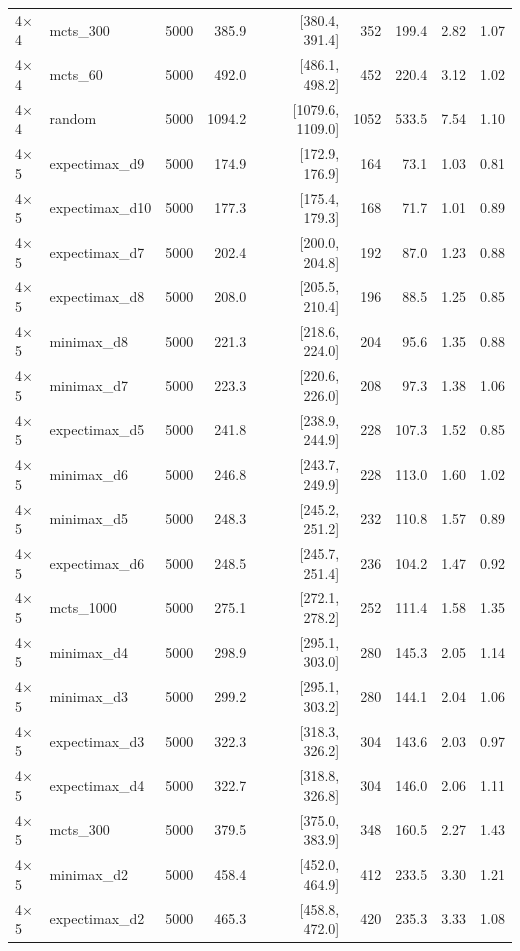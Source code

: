 {\begin{longtable}{llrrrrrrr}
4$\times$4 & mcts\_300 & 5000 & 385.9 & [380.4, 391.4] & 352 & 199.4 & 2.82 & 1.07 \\
4$\times$4 & mcts\_60 & 5000 & 492.0 & [486.1, 498.2] & 452 & 220.4 & 3.12 & 1.02 \\
4$\times$4 & random & 5000 & 1094.2 & [1079.6, 1109.0] & 1052 & 533.5 & 7.54 & 1.10 \\
\midrule
4$\times$5 & expectimax\_d9 & 5000 & 174.9 & [172.9, 176.9] & 164 & 73.1 & 1.03 & 0.81 \\
4$\times$5 & expectimax\_d10 & 5000 & 177.3 & [175.4, 179.3] & 168 & 71.7 & 1.01 & 0.89 \\
4$\times$5 & expectimax\_d7 & 5000 & 202.4 & [200.0, 204.8] & 192 & 87.0 & 1.23 & 0.88 \\
4$\times$5 & expectimax\_d8 & 5000 & 208.0 & [205.5, 210.4] & 196 & 88.5 & 1.25 & 0.85 \\
4$\times$5 & minimax\_d8 & 5000 & 221.3 & [218.6, 224.0] & 204 & 95.6 & 1.35 & 0.88 \\
4$\times$5 & minimax\_d7 & 5000 & 223.3 & [220.6, 226.0] & 208 & 97.3 & 1.38 & 1.06 \\
4$\times$5 & expectimax\_d5 & 5000 & 241.8 & [238.9, 244.9] & 228 & 107.3 & 1.52 & 0.85 \\
4$\times$5 & minimax\_d6 & 5000 & 246.8 & [243.7, 249.9] & 228 & 113.0 & 1.60 & 1.02 \\
4$\times$5 & minimax\_d5 & 5000 & 248.3 & [245.2, 251.2] & 232 & 110.8 & 1.57 & 0.89 \\
4$\times$5 & expectimax\_d6 & 5000 & 248.5 & [245.7, 251.4] & 236 & 104.2 & 1.47 & 0.92 \\
4$\times$5 & mcts\_1000 & 5000 & 275.1 & [272.1, 278.2] & 252 & 111.4 & 1.58 & 1.35 \\
4$\times$5 & minimax\_d4 & 5000 & 298.9 & [295.1, 303.0] & 280 & 145.3 & 2.05 & 1.14 \\
4$\times$5 & minimax\_d3 & 5000 & 299.2 & [295.1, 303.2] & 280 & 144.1 & 2.04 & 1.06 \\
4$\times$5 & expectimax\_d3 & 5000 & 322.3 & [318.3, 326.2] & 304 & 143.6 & 2.03 & 0.97 \\
4$\times$5 & expectimax\_d4 & 5000 & 322.7 & [318.8, 326.8] & 304 & 146.0 & 2.06 & 1.11 \\
4$\times$5 & mcts\_300 & 5000 & 379.5 & [375.0, 383.9] & 348 & 160.5 & 2.27 & 1.43 \\
4$\times$5 & minimax\_d2 & 5000 & 458.4 & [452.0, 464.9] & 412 & 233.5 & 3.30 & 1.21 \\
4$\times$5 & expectimax\_d2 & 5000 & 465.3 & [458.8, 472.0] & 420 & 235.3 & 3.33 & 1.08 \\

\end{longtable}}
